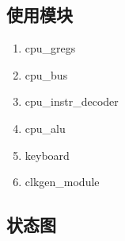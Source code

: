 \subsection{使用模块}
\begin{enumerate}
    \item cpu\_gregs
    \item cpu\_bus
    \item cpu\_instr\_decoder
    \item cpu\_alu
    \item keyboard
    \item clkgen\_module
\end{enumerate}

\subsection{状态图}
